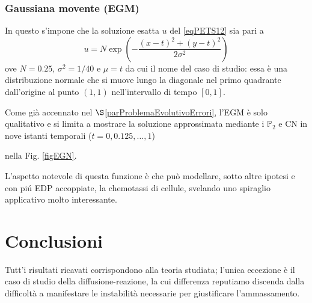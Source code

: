 \documentclass{article}
\newcommand{\SpaziaturaMate}[3]{
    \setlength{\thinmuskip}{#1mu}
    \setlength{\medmuskip}{#2mu}
    \setlength{\thickmuskip}{#3mu}
}
\begin{document}
            \subsubsection{Gaussiana movente (EGM)}

                In questo s'impone che la soluzione esatta $u$ del \eqref{eqPETS12} sia pari a
                \begin{equation*}
                    u=N\exp\left(-\frac{(x-t)^2+(y-t)^2}{2\sigma^2}\right)
                    \label{eqSoluzioneEsattaEGM}
                \end{equation*}
                ove $N=0.25$, $\sigma^2=1/40$ e $\mu=t$ da cui il nome del caso di studio: essa è una distribuzione normale che si muove lungo la diagonale nel primo quadrante dall'origine al punto $(1,1)$ nell'intervallo di tempo $[0,1]$.

                {\SpaziaturaMate{1}{2}{3}
                Come già accennato nel $\S$\ref{parProblemaEvolutivoErrori}, l'EGM è solo qualitativo e si limita a mostrare la soluzione approssimata mediante i $\mathbb P_2$ e CN in nove istanti temporali ($t=0,0.125,\ldots,1$)} nella Fig. \ref{figEGN}.

                L'aspetto notevole di questa funzione è che può modellare, sotto altre ipotesi e con piú EDP accoppiate, la chemotassi di cellule, svelando uno spiraglio applicativo molto interessante.

    
    \section{Conclusioni}

        Tutt'i risultati ricavati corrispondono alla teoria studiata; l'unica eccezione è il caso di studio della diffusione-reazione, la cui differenza reputiamo discenda dalla difficoltà a manifestare le instabilità necessarie per giustificare l'ammassamento.

    
    
    
    \nocite{*} %
\end{document}
